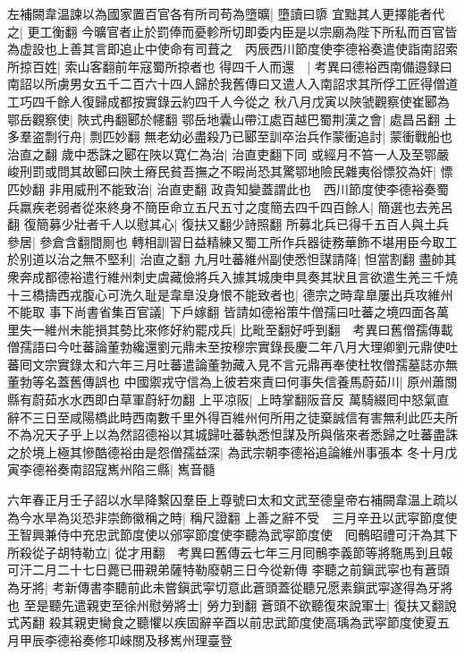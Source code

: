 左補闕韋温諫以為國家置百官各有所司苟為墮曠|{
	墮讀曰隳}
宜黜其人更擇能者代之|{
	更工衡翻}
今曠官者止於罰俸而憂軫所切即委内臣是以宗廟為陛下所私而百官皆為虚設也上善其言即追止中使命有司葺之　丙辰西川節度使李德裕奏遣使詣南詔索所掠百姓|{
	索山客翻前年寇蜀所掠者也}
得四千人而還　|{
	考異曰德裕西南備邉録曰南詔以所虜男女五千二百六十四人歸於我舊傳曰又遣人入南詔求其所俘工匠得僧道工巧四千餘人復歸成都按實錄云約四千人今從之}
秋八月戊寅以陜虢觀察使崔郾為鄂岳觀察使|{
	陜式冉翻郾於幰翻}
鄂岳地囊山帶江處百越巴蜀荆漢之會|{
	處昌呂翻}
土多羣盗剽行舟|{
	剽匹妙翻}
無老幼必盡殺乃已郾至訓卒治兵作蒙衝追討|{
	蒙衝戰船也治直之翻}
歲中悉誅之郾在陜以寛仁為治|{
	治直吏翻下同}
或經月不笞一人及至鄂嚴峻刑罰或問其故郾曰陜土瘠民貧吾撫之不暇尚恐其驚鄂地險民雜夷俗慓狡為奸|{
	慓匹妙翻}
非用威刑不能致治|{
	治直吏翻}
政貴知變蓋謂此也　西川節度使李德裕奏蜀兵羸疾老弱者從來終身不簡臣命立五尺五寸之度簡去四千四百餘人|{
	簡選也去羌呂翻}
復簡募少壯者千人以慰其心|{
	復扶又翻少詩照翻}
所募北兵已得千五百人與土兵參居|{
	參倉含翻間厠也}
轉相訓習日益精練又蜀工所作兵器徒務華飾不堪用臣今取工於别道以治之無不堅利|{
	治直之翻}
九月吐蕃維州副使悉怛謀請降|{
	怛當割翻}
盡帥其衆奔成都德裕遣行維州刺史虞藏儉將兵入據其城庚申具奏其狀且言欲遣生羌三千燒十三橋擣西戎腹心可洗久耻是韋臯没身恨不能致者也|{
	德宗之時韋臯屢出兵攻維州不能取}
事下尚書省集百官議|{
	下戶嫁翻}
皆請如德裕策牛僧孺曰吐蕃之境四面各萬里失一維州未能損其勢比來修好約罷戍兵|{
	比毗至翻好呼到翻　考異曰舊僧孺傳載僧孺語曰今吐蕃論董勃纔還劉元鼎未至按穆宗實錄長慶二年八月大理卿劉元鼎使吐蕃囘文宗實錄太和六年三月吐蕃遣論董勃藏入見不言元鼎再奉使杜牧僧孺墓誌亦無董勃等名蓋舊傳誤也}
中國禦戎守信為上彼若來責曰何事失信養馬蔚茹川|{
	原州蕭關縣有蔚茹水水西即白草軍蔚紆勿翻}
上平凉阪|{
	上時掌翻阪音反}
萬騎綴囘中怒氣直辭不三日至咸陽橋此時西南數千里外得百維州何所用之徒棄誠信有害無利此匹夫所不為况天子乎上以為然詔德裕以其城歸吐蕃執悉怛謀及所與偕來者悉歸之吐蕃盡誅之於境上極其慘酷德裕由是怨僧孺益深|{
	為武宗朝李德裕追論維州事張本}
冬十月戊寅李德裕奏南詔寇嶲州陷三縣|{
	嶲音髓}


六年春正月壬子詔以水旱降繫囚羣臣上尊號曰太和文武至德皇帝右補闕韋温上疏以為今水旱為災恐非崇飾徽稱之時|{
	稱尺證翻}
上善之辭不受　三月辛丑以武寜節度使王智興兼侍中充忠武節度使以邠寜節度使李聽為武寜節度使　囘鶻昭禮可汗為其下所殺從子胡特勒立|{
	從才用翻　考異曰舊傳云七年三月囘鶻李義節等將駞馬到且報可汗二月二十七日薨已冊親弟薩特勒廢朝三日今從新傳}
李聽之前鎭武寜也有蒼頭為牙將|{
	考新傳書李聽前此未嘗鎭武寜切意此蒼頭蓋從聽兄愿素鎭武寜遂得為牙將也}
至是聽先遣親吏至徐州慰勞將士|{
	勞力到翻}
蒼頭不欲聽復來說軍士|{
	復扶又翻說式芮翻}
殺其親吏臠食之聽懼以疾固辭辛酉以前忠武節度使高瑀為武寜節度使夏五月甲辰李德裕奏修卭崍關及移嶲州理臺登

